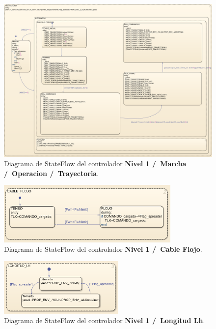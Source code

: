 \documentclass[11pt]{article}
\begin{document}
\begin{figure}
	\centering
	\includegraphics[width=1\textwidth]{images/stateflow_nivel_1/controlador_nivel1_operacion_trayectoria.png}
	\caption{Diagrama de StateFlow del controlador \textbf{Nivel 1 /\ Marcha /\ Operacion /\ Trayectoria}.}
	\label{fig:nivel_1_trayectoria}
\end{figure}

\begin{figure}
	\centering
	\includegraphics[width=0.8\textwidth]{images/stateflow_nivel_1/controlador_nivel1_cable_flojo.png}
	\caption{Diagrama de StateFlow del controlador \textbf{Nivel 1 /\ Cable Flojo}.}
	\label{fig:nivel_1_cable_flojo}
\end{figure}

\begin{figure}
	\centering
	\includegraphics[width=0.55\textwidth]{images/stateflow_nivel_1/controlador_nivel1_longitud_lh.png}
	\caption{Diagrama de StateFlow del controlador \textbf{Nivel 1 /\ Longitud Lh}.}
	\label{fig:nivel_1_longitud_lh}
\end{figure}
\end{document}
